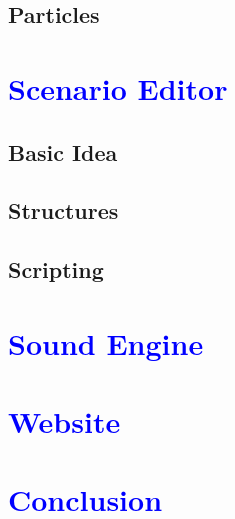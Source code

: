 \documentclass[article]{report}         %
\begin{document}
      \section{Particles}
    \chapter{\textcolor{blue}{Scenario Editor}}
      \section{Basic Idea}
      \section{Structures}
      \section{Scripting}
    \chapter{\textcolor{blue}{Sound Engine}}
    \chapter{\textcolor{blue}{Website}}
    \chapter{\textcolor{blue}{Conclusion}}
    
\end{document}
